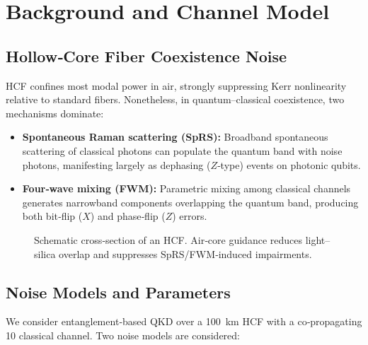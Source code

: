 \documentclass[conference]{IEEEtran}
\begin{document}
    \section{Background and Channel Model}\label{sec:background}

    \subsection{Hollow‑Core Fiber Coexistence Noise}
    HCF confines most modal power in air, strongly suppressing Kerr nonlinearity relative to standard fibers.  
Nonetheless, in quantum–classical coexistence, two mechanisms dominate:

    \begin{itemize}[leftmargin=*,itemsep=1pt]
      \item \textbf{Spontaneous Raman scattering (SpRS):} Broadband spontaneous scattering of classical photons can 
populate the quantum band with noise photons, manifesting largely as dephasing ($Z$‑type) events on photonic qubits.
      \item \textbf{Four‑wave mixing (FWM):} Parametric mixing among classical channels generates narrowband components 
overlapping the quantum band, producing both bit‑flip ($X$) and phase‑flip ($Z$) errors.
    \end{itemize}

    \begin{figure}[t]
    \centering
    \caption{Schematic cross‑section of an HCF.  Air‑core guidance reduces light–silica overlap and suppresses 
SpRS/FWM‑induced impairments.}
    \label{fig:hcf}
    \end{figure}

    \subsection{Noise Models and Parameters}\label{sec:noise_models}
    We consider entanglement‑based QKD over a \SI{100}{\kilo\meter} HCF with a co‑propagating \SI{10}{\dBm} classical 
channel.  Two noise models are considered:
\end{document}
